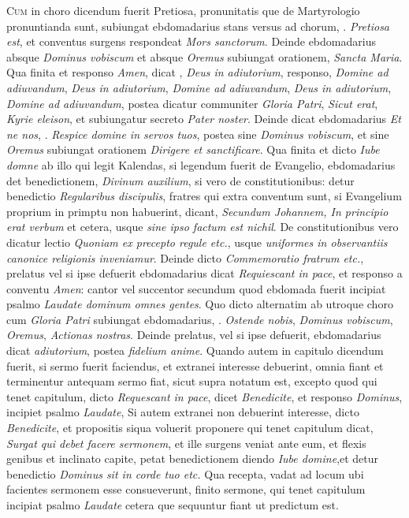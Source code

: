 \begin{multicols*}{2}
{\color{Red} }
\lettrine[lines=2]{\zallmancaps \color{Red} C}{um} in choro dicendum fuerit Pretiosa, pronunitatis que de Martyrologio pronuntianda sunt, subiungat ebdomadarius stans versus ad chorum, \Vbar . \textit{Pretiosa est}, et conventus surgens respondeat \textit{Mors sanctorum}. Deinde ebdomadarius absque \textit{Dominus vobiscum} et absque \textit{Oremus} subiungat orationem, \textit{Sancta Maria}. Qua finita et responso \textit{Amen}, dicat \Vbar , \textit{Deus in adiutorium}, responso, \textit{Domine ad adiuvandum}, \textit{Deus in adiutorium}, \textit{Domine ad adiuvandum}, \textit{Deus in adiutorium}, \textit{Domine ad adiuvandum}, postea dicatur communiter \textit{Gloria Patri}, \textit{Sicut erat}, \textit{Kyrie eleison}, et subiungatur secreto \textit{Pater noster}.
Deinde dicat ebdomadarius \textit{Et ne nos}, \Vbar . \textit{Respice domine in servos tuos}, postea sine \textit{Dominus vobiscum}, et sine \textit{Oremus} subiungat orationem \textit{Dirigere et sanctificare}.
Qua finita et dicto \textit{Iube domne} ab illo qui legit Kalendas, si legendum fuerit de Evangelio, ebdomadarius det benedictionem, \textit{Divinum auxilium}, si vero de constitutionibus: detur benedictio \textit{Regularibus discipulis}, fratres qui extra conventum sunt, si Evangelium proprium in primptu non habuerint, dicant, \textit{Secundum Johannem, In principio erat verbum} et cetera, usque \textit{sine ipso factum est nichil}. De constitutionibus vero dicatur lectio \textit{Quoniam ex precepto regule etc.}, usque \textit{uniformes in observantiis canonice religionis inveniamur}. Deinde dicto \textit{Commemoratio fratrum etc.}, prelatus vel si ipse defuerit ebdomadarius dicat \textit{Requiescant in pace}, et responso a conventu \textit{Amen}: cantor vel succentor secundum quod ebdomada fuerit incipiat psalmo \textit{Laudate dominum omnes gentes}. Quo dicto alternatim ab utroque choro cum \textit{Gloria Patri} subiungat ebdomadarius, \Vbar . \textit{Ostende nobis}, \textit{Dominus vobiscum}, \textit{Oremus}, \textit{Actionas nostras}. Deinde prelatus, vel si ipse defuerit, ebdomadarius dicat \textit{adiutorium}, postea \textit{fidelium anime}.
Quando autem in capitulo dicendum fuerit, si sermo fuerit faciendus, et extranei interesse debuerint, omnia fiant et terminentur antequam sermo fiat, sicut supra notatum est, excepto quod qui tenet capitulum, dicto \textit{Requescant in pace}, dicet \textit{Benedicite}, et responso \textit{Dominus}, incipiet psalmo \textit{Laudate}, Si autem extranei non debuerint interesse, dicto \textit{Benedicite}, et propositis siqua voluerit proponere qui tenet capitulum dicat, \textit{Surgat qui debet facere sermonem}, et ille surgens veniat ante eum, et flexis genibus et inclinato capite, petat benedictionem diendo \textit{Iube domine},et detur benedictio \textit{Dominus sit in corde tuo etc.} Qua recepta, vadat ad locum ubi facientes sermonem esse consueverunt, finito sermone, qui tenet capitulum incipiat psalmo \textit{Laudate} cetera que sequuntur fiant ut predictum est.

\end{multicols*}
